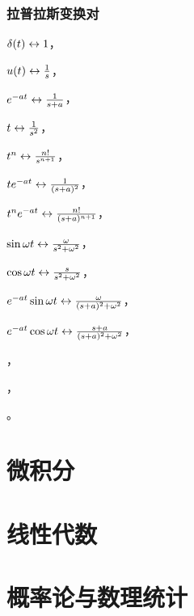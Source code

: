 \documentclass[UTF8]{ctexbook}
\begin{document}
\section{拉普拉斯变换对}
  \begin{tabenum}[(1)] \qquad \qquad
    \item $ \delta(t)\leftrightarrow 1 $，
    \item $ u(t)\leftrightarrow \frac{1}{s} $，
    \item $ e^{-at}\leftrightarrow \frac{1}{s+a} $，\\
    \item $ t\leftrightarrow \frac{1}{s^2} $，
    \item $ t^n\leftrightarrow \frac{n!}{s^{n+1}} $，\\
    \item $ t e^{-at}\leftrightarrow \frac{1}{(s+a)^2} $，
    \item $ t^n e^{-at}\leftrightarrow \frac{n!}{(s+a)^{n+1}} $，\\
    \item $ \sin \omega t\leftrightarrow \frac{\omega}{s^2+\omega^2} $，
    \item $ \cos \omega t\leftrightarrow \frac{s}{s^2+\omega^2} $，\\
    \item $ e^{-at}\sin \omega t\leftrightarrow \frac{\omega}{(s+a)^2+\omega^2} $，
    \item $ e^{-at}\cos \omega t\leftrightarrow \frac{s+a}{(s+a)^2+\omega^2} $，\\
    \item $  $，
    \item $  $，\\
    \item $  $。
  \end{tabenum}
\frontmatter
{}

%
%

%
%

\tableofcontents

\mainmatter

\part{微积分}


\part{线性代数}

\part{概率论与数理统计}


%

%
%

%
\end{document}
